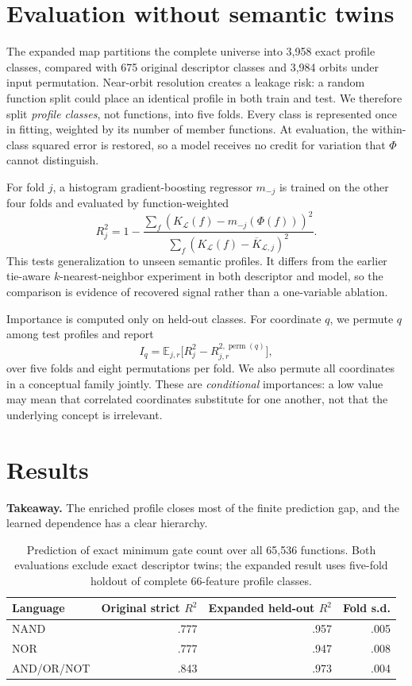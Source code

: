 \documentclass[10pt]{article}
\theoremstyle{definition}
\begin{document}
\section{Evaluation without semantic twins}

The expanded map partitions the complete universe into 3,958 exact profile
classes, compared with 675 original descriptor classes and 3,984 orbits under
input permutation.  Near-orbit resolution creates a leakage risk: a random
function split could place an identical profile in both train and test.
We therefore split \emph{profile classes}, not functions, into five folds.
Every class is represented once in fitting, weighted by its number of member
functions.  At evaluation, the within-class squared error is restored, so a
model receives no credit for variation that $\Phi$ cannot distinguish.

For fold $j$, a histogram gradient-boosting regressor $m_{-j}$ is trained on
the other four folds and evaluated by function-weighted
\[
 R^2_j=1-\frac{\sum_f(K_{\mathcal L}(f)-m_{-j}(\Phi(f)))^2}
 {\sum_f(K_{\mathcal L}(f)-\overline K_{\mathcal L,j})^2}.             \tag{3}
\]
This tests generalization to unseen semantic profiles.  It differs from the
earlier tie-aware $k$-nearest-neighbor experiment in both descriptor and model,
so the comparison is evidence of recovered signal rather than a one-variable
ablation.

Importance is computed only on held-out classes.  For coordinate $q$, we
permute $q$ among test profiles and report
\[
 I_q=\mathbb E_{j,r}\bigl[R^2_j-R^{2,\operatorname{perm}(q)}_{j,r}\bigr],
 \tag{4}
\]
over five folds and eight permutations per fold.  We also permute all
coordinates in a conceptual family jointly.  These are \emph{conditional}
importances: a low value may mean that correlated coordinates substitute for
one another, not that the underlying concept is irrelevant.

\section{Results}

\textbf{Takeaway.} The enriched profile closes most of the finite prediction
gap, and the learned dependence has a clear hierarchy.

\begin{table}[!htbp]
\centering\small
\begin{tabular}{lrrr}
\toprule
Language & Original strict $R^2$ & Expanded held-out $R^2$ & Fold s.d. \\
\midrule
NAND       & .777 & .957 & .005 \\
NOR        & .777 & .947 & .008 \\
AND/OR/NOT & .843 & .973 & .004 \\
\bottomrule
\end{tabular}
\caption{Prediction of exact minimum gate count over all 65,536 functions.
Both evaluations exclude exact descriptor twins; the expanded result uses
five-fold holdout of complete 66-feature profile classes.}
\label{tab:prediction}
\end{table}
\end{document}
